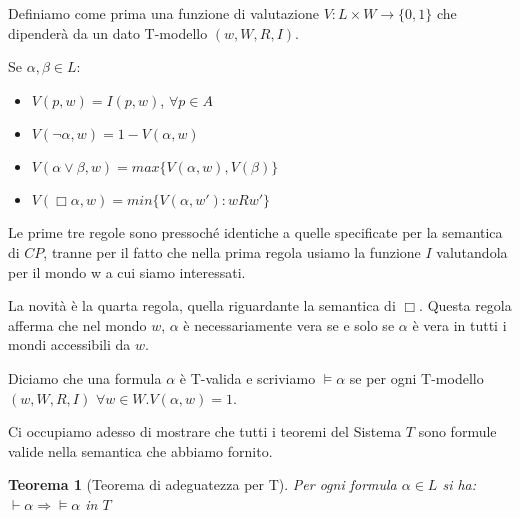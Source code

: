 \documentclass[a4paper, titlepage, 12pt]{report}
\newtheorem{theorem}{Teorema}[chapter]
\begin{document}
Definiamo come prima una funzione di valutazione $V : L \times W \to \{0, 1\}$ che dipenderà da un dato T-modello
$(w, W, R, I)$.

Se $\alpha, \beta \in L$:
\begin{itemize}
\item $V(p, w) = I(p, w)$, $\forall p \in A$
\item $V(\neg \alpha, w) = 1 - V(\alpha, w)$
\item $V(\alpha \vee \beta, w) = max\{V(\alpha, w), V(\beta)\}$
\item $V(\Box \alpha, w) = min\{ V(\alpha, w') : w R w' \}$
\end{itemize}

Le prime tre regole sono pressoché identiche a quelle specificate per la semantica di $CP$,
tranne per il fatto che nella prima regola usiamo la funzione $I$ valutandola per il mondo w
a cui siamo interessati.

La novità è la quarta regola, quella riguardante la semantica di $\Box$.
Questa regola afferma che nel mondo $w$, $\alpha$ è necessariamente vera se e solo se
$\alpha$ è vera in tutti i mondi accessibili da $w$.

Diciamo che una formula $\alpha$ è T-valida e scriviamo $\vDash \alpha$
se per ogni T-modello $(w, W, R, I)$ $\forall w \in W. V(\alpha, w) = 1$.

Ci occupiamo adesso di mostrare che tutti i teoremi del Sistema $T$ sono
formule valide nella semantica che abbiamo fornito.

\begin{theorem}[Teorema di adeguatezza per T]
Per ogni formula $\alpha \in L$ si ha: $\vdash \alpha \Rightarrow \vDash \alpha$ in $T$
\end{theorem}
\end{document}
